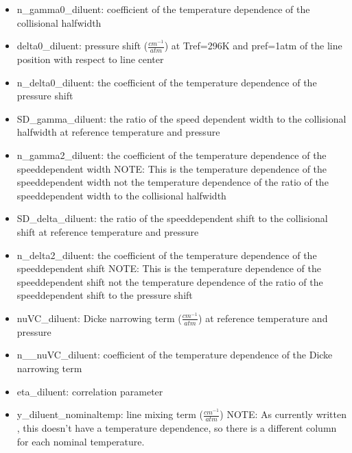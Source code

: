 \documentclass[letterpaper,10pt,english]{sphinxmanual}
\begin{document}
\begin{description}
\begin{itemize}
\item {} 
\sphinxAtStartPar
n\_gamma0\_diluent: coefficient of the temperature dependence of the collisional half\sphinxhyphen{}width

\item {} 
\sphinxAtStartPar
delta0\_diluent: pressure shift (\(\frac{cm^{-1}}{atm}\)) at Tref=296K and pref=1atm of the line position with respect to line center

\item {} 
\sphinxAtStartPar
n\_delta0\_diluent:  the coefficient of the temperature dependence of the pressure shift

\item {} 
\sphinxAtStartPar
SD\_gamma\_diluent: the ratio of the speed dependent width to the collisional half\sphinxhyphen{}width at reference temperature and pressure

\item {} 
\sphinxAtStartPar
n\_gamma2\_diluent: the coefficient of the temperature dependence of the speed\sphinxhyphen{}dependent width NOTE: This is the temperature dependence of the speed\sphinxhyphen{}dependent width not the temperature dependence of the ratio of the speed\sphinxhyphen{}dependent width to the collisional half\sphinxhyphen{}width

\item {} 
\sphinxAtStartPar
SD\_delta\_diluent:  the ratio of the speed\sphinxhyphen{}dependent shift to the collisional shift at reference temperature and pressure

\item {} 
\sphinxAtStartPar
n\_delta2\_diluent: the coefficient of the temperature dependence of the speed\sphinxhyphen{}dependent shift NOTE: This is the temperature dependence of the speed\sphinxhyphen{}dependent shift not the temperature dependence of the ratio of the speed\sphinxhyphen{}dependent shift to the pressure shift

\item {} 
\sphinxAtStartPar
nuVC\_diluent: Dicke narrowing term (\(\frac{cm^{-1}}{atm}\)) at reference temperature and pressure

\item {} 
\sphinxAtStartPar
n\_\_nuVC\_diluent:  coefficient of the temperature dependence of the Dicke narrowing term

\item {} 
\sphinxAtStartPar
eta\_diluent:  correlation parameter

\item {} 
\sphinxAtStartPar
y\_diluent\_nominaltemp: line mixing term (\(\frac{cm^{-1}}{atm}\)) NOTE: As currently written , this doesn’t have a temperature dependence, so there is a different column for each nominal temperature.

\end{itemize}

\end{description}
\end{document}
